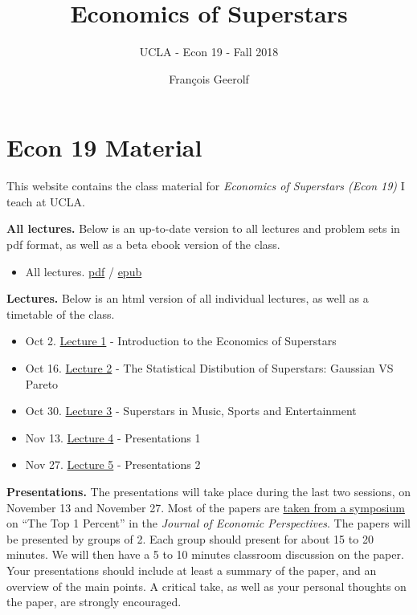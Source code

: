 \documentclass[]{book}
\title{Economics of Superstars}
\subtitle{UCLA - Econ 19 - Fall 2018}
\author{François Geerolf}
\date{}
\providecommand{\tightlist}{%
  \setlength{\itemsep}{0pt}\setlength{\parskip}{0pt}}
\theoremstyle{definition}
\theoremstyle{definition}
\theoremstyle{definition}
\theoremstyle{remark}
\begin{document}
\maketitle

{
\setcounter{tocdepth}{2}
\tableofcontents
}
\listoftables
\listoffigures
\chapter*{Econ 19 Material}\label{econ-19-material}

This website contains the class material for \emph{Economics of
Superstars (Econ 19)} I teach at UCLA.

\textbf{All lectures.} Below is an up-to-date version to all lectures
and problem sets in pdf format, as well as a beta ebook version of the
class.

\begin{itemize}
\tightlist
\item
  All lectures. \href{ucla-19-fall2018.pdf}{pdf} /
  \href{ucla-19-fall2018.epub}{epub}
\end{itemize}

\textbf{Lectures.} Below is an html version of all individual lectures,
as well as a timetable of the class.

\begin{itemize}
\tightlist
\item
  Oct 2. \protect\hyperlink{intro-superstars}{Lecture 1} - Introduction
  to the Economics of Superstars
\item
  Oct 16. \protect\hyperlink{statistics-superstars}{Lecture 2} - The
  Statistical Distibution of Superstars: Gaussian VS Pareto
\item
  Oct 30. \protect\hyperlink{music-entertainment-superstars}{Lecture 3}
  - Superstars in Music, Sports and Entertainment
\item
  Nov 13. \protect\hyperlink{presentations1}{Lecture 4} - Presentations
  1
\item
  Nov 27. \protect\hyperlink{presentations2}{Lecture 5} - Presentations
  2
\end{itemize}

\textbf{Presentations.} The presentations will take place during the
last two sessions, on November 13 and November 27. Most of the papers
are \href{https://www.aeaweb.org/issues/313}{taken from a symposium} on
``The Top 1 Percent'' in the \emph{Journal of Economic Perspectives}.
The papers will be presented by groups of 2. Each group should present
for about 15 to 20 minutes. We will then have a 5 to 10 minutes
classroom discussion on the paper. Your presentations should include at
least a summary of the paper, and an overview of the main points. A
critical take, as well as your personal thoughts on the paper, are
strongly encouraged.
\end{document}
